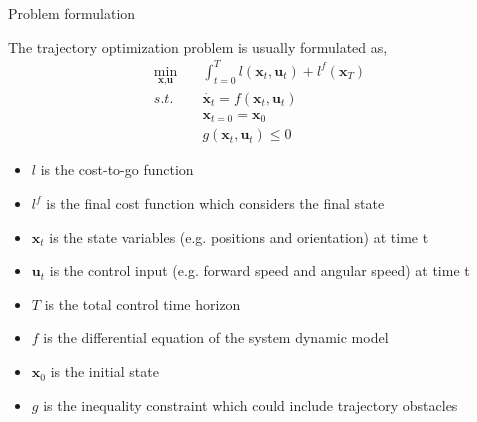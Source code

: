 \documentclass[10pt,compress]{beamer}
\begin{document}
\begin{frame}{Problem formulation}

The trajectory optimization problem is usually formulated as, 
\begin{align}
    \min_{\textbf{x}, \textbf{u}} \quad & \int^{T}_{t=0} l(\textbf{x}_t, \textbf{u}_t) + l^f(\textbf{x}_{T}) \\
    s.t. \quad & \Dot{\textbf{x}_t} = f(\textbf{x}_t, \textbf{u}_t) \\
    & \textbf{x}_{t=0} = \textbf{x}_0 \\
    & g(\textbf{x}_t, \textbf{u}_t) \leq 0
\end{align}

\begin{itemize}
    \item $l$ is the cost-to-go function \\
    \item $l^f$ is the final cost function which considers the final state \\
    \item $\textbf{x}_t$ is the state variables (e.g. positions and orientation) at time t \\
    \item $\textbf{u}_t$ is the control input (e.g. forward speed and angular speed) at time t \\
    \item $T$ is the total control time horizon \\
    \item $f$ is the differential equation of the system dynamic model \\
    \item $\textbf{x}_0$ is the initial state \\
    \item $g$ is the inequality constraint which could include trajectory obstacles 
\end{itemize}
\end{frame}
\end{document}
